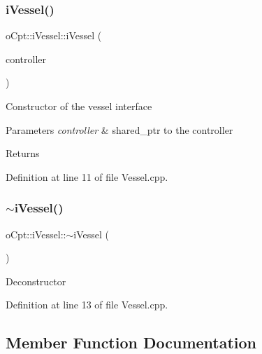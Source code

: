 \hypertarget{classo_cpt_1_1i_vessel_ac4f486fcfad657f860da2062fef9d7d6}{}\label{classo_cpt_1_1i_vessel_ac4f486fcfad657f860da2062fef9d7d6} 
\subsubsection{\texorpdfstring{i\+Vessel()}{iVessel()}\hspace{0.1cm}{\footnotesize\ttfamily [2/2]}}
{\footnotesize\ttfamily o\+Cpt\+::i\+Vessel\+::i\+Vessel (\begin{DoxyParamCaption}\item[{\hyperlink{classo_cpt_1_1i_controller_a6d89a95cd6ad68bb74adfaca2f36370f}{i\+Controller\+::ptr}}]{controller }\end{DoxyParamCaption})}

Constructor of the vessel interface 
\begin{DoxyParams}{Parameters}
{\em controller} & shared\+\_\+ptr to the controller \\
\hline
\end{DoxyParams}
\begin{DoxyReturn}{Returns}

\end{DoxyReturn}


Definition at line 11 of file Vessel.\+cpp.

\hypertarget{classo_cpt_1_1i_vessel_acceefb7d9bffed4f4d8c86fa6808ec23}{}\label{classo_cpt_1_1i_vessel_acceefb7d9bffed4f4d8c86fa6808ec23} 
\subsubsection{\texorpdfstring{$\sim$i\+Vessel()}{~iVessel()}}
{\footnotesize\ttfamily o\+Cpt\+::i\+Vessel\+::$\sim$i\+Vessel (\begin{DoxyParamCaption}{ }\end{DoxyParamCaption})\hspace{0.3cm}{\ttfamily [virtual]}}

Deconstructor 

Definition at line 13 of file Vessel.\+cpp.



\subsection{Member Function Documentation}
\hypertarget{classo_cpt_1_1i_vessel_aa0c1f81d32a997bb3be3a4edb292b8f9}{}\label{classo_cpt_1_1i_vessel_aa0c1f81d32a997bb3be3a4edb292b8f9} 
